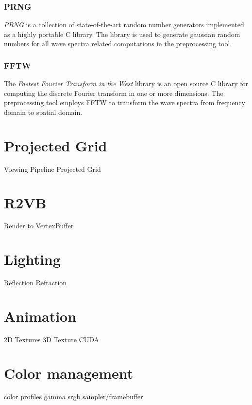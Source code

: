 \subsubsection{PRNG}

\textit{PRNG}\cite{misc:prng} is a collection of state-of-the-art random number
generators implemented as a highly portable C library. The library is used to
generate gaussian random numbers for all wave spectra related computations in
the preprocessing tool.

\subsubsection{FFTW}
The \textit{Fastest Fourier Transform in the West} library\cite{misc:fftw} is an
open source C library for computing the discrete Fourier transform in one or
more dimensions. The preprocessing tool employs FFTW to transform the wave
spectra from frequency domain to spatial domain.

\section{Projected Grid}
Viewing Pipeline
Projected Grid

\section{R2VB}
Render to VertexBuffer

\section{Lighting}
Reflection
Refraction

\section{Animation}
2D Textures
3D Texture
CUDA

\section{Color management}
color profiles
gamma
srgb sampler/framebuffer